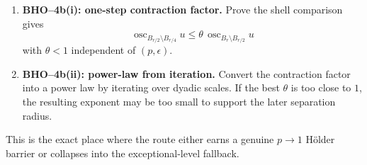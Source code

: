 \begin{remark}
\begin{enumerate}
    \item \textbf{BHO--4b(i): one-step contraction factor.}
    Prove the shell comparison gives
    \[
        \operatorname{osc}_{B_{r/2}\setminus B_{r/4}}u
        \le \theta\,\operatorname{osc}_{B_r\setminus B_{r/2}}u
    \]
    with \(\theta<1\) independent of \((p,\epsilon)\).

    \item \textbf{BHO--4b(ii): power-law from iteration.}
    Convert the contraction factor into a power law by iterating over dyadic
    scales.  If the best \(\theta\) is too close to \(1\), the resulting
    exponent may be too small to support the later separation radius.
\end{enumerate}
This is the exact place where the route either earns a genuine \(p\to1\)
Hölder barrier or collapses into the exceptional-level fallback.
\end{remark}

